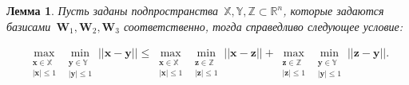 \documentclass[12pt, twoside]{article}
\newtheorem{lemma}[theorem]{Лемма}
\numberwithin{equation}{section}
\begin{document}
\begin{lemma} \label{lem:2} 
Пусть заданы подпространства~$\mathbb{X}, \mathbb{Y}, \mathbb{Z} \subset \mathbb{R}^{n}$, которые задаются базисами~$\textbf{W}_1, \textbf{W}_2, \textbf{W}_3$ соответственно, тогда справедливо следующее условие:

\begin{equation}
\label{eq:l2:1}
\begin{aligned}
\max_{\substack{\textbf{x} \in \mathbb{X} \\ \left|\textbf{x}\right|\leq 1}}\min_{\substack{\textbf{y} \in \mathbb{Y} \\ \left|\textbf{y}\right|\leq 1}}||\textbf{x}-\textbf{y}||\leq 
\max_{\substack{\textbf{x} \in \mathbb{X} \\ \left|\textbf{x}\right|\leq 1}}\min_{\substack{\textbf{z} \in \mathbb{Z} \\ \left|\textbf{z}\right|\leq 1}}||\textbf{x}-\textbf{z}|| + 
\max_{\substack{\textbf{z} \in \mathbb{Z} \\ \left|\textbf{z}\right|\leq 1}}\min_{\substack{\textbf{y} \in \mathbb{Y} \\ \left|\textbf{y}\right|\leq 1}}||\textbf{z}-\textbf{y}||.
\end{aligned}
\end{equation}
\end{lemma}
\end{document}
